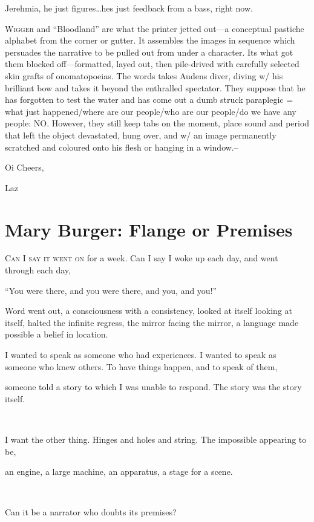 \documentclass[
]{memoir}
\begin{document}
Jerehmia, he just figures\ldots{}hes just feedback from a bass, right
now.

\textsc{Wigger} and ``Bloodland'' are what the printer jetted out---a
conceptual pastiche alphabet from the corner or gutter. It assembles the
images in sequence which persuades the narrative to be pulled out from
under a character. Its what got them blocked off---formatted, layed out,
then pile-drived with carefully selected skin grafts of onomatopoeias.
The words takes Audens diver, diving w/ his brilliant bow and takes it
beyond the enthralled spectator. They suppose that he has forgotten to
test the water and has come out a dumb struck paraplegic = what just
happened/where are our people/who are our people/do we have any people:
NO. However, they still keep tabs on the moment, place sound and period
that left the object devastated, hung over, and w/ an image permanently
scratched and coloured onto his flesh or hanging in a window.--

Oi Cheers,

Laz

\hypertarget{mary-burger-flange-or-premises}{%
\chapter{Mary Burger: Flange or
Premises}\label{mary-burger-flange-or-premises}}

\lettrine[lines=3, findent=0em, nindent=0.1em, lhang=0]{C}{an I say it went on}
for a week. Can I say I woke up each day, and went through each day,

``You were there, and you were there, and you, and you!''

Word went out, a consciousness with a consistency, looked at itself
looking at itself, halted the infinite regress, the mirror facing the
mirror, a language made possible a belief in location.

I wanted to speak as someone who had experiences. I wanted to speak as
someone who knew others. To have things happen, and to speak of them,

someone told a story to which I was unable to respond. The story was the
story itself.

~

I want the other thing. Hinges and holes and string. The impossible
appearing to be,

an engine, a large machine, an apparatus, a stage for a scene.

~

Can it be a narrator who doubts its premises?
\end{document}
